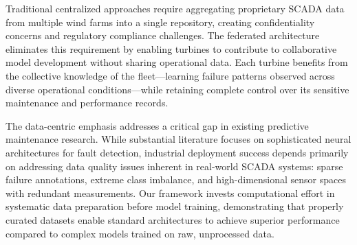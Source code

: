 \documentclass[12pt]{article}
\begin{document}
    

 Traditional centralized approaches require aggregating proprietary SCADA data from multiple wind farms into a single repository, creating confidentiality concerns and regulatory compliance challenges. The federated architecture eliminates this requirement by enabling turbines to contribute to collaborative model development without sharing operational data. Each turbine benefits from the collective knowledge of the fleet—learning failure patterns observed across diverse operational conditions—while retaining complete control over its sensitive maintenance and performance records.

The data-centric emphasis addresses a critical gap in existing predictive maintenance research. While substantial literature focuses on sophisticated neural architectures for fault detection, industrial deployment success depends primarily on addressing data quality issues inherent in real-world SCADA systems: sparse failure annotations, extreme class imbalance, and high-dimensional sensor spaces with redundant measurements. Our framework invests computational effort in systematic data preparation before model training, demonstrating that properly curated datasets enable standard architectures to achieve superior performance compared to complex models trained on raw, unprocessed 
data.
\end{document}
